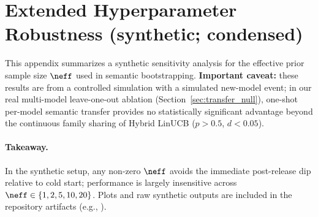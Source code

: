 \section{Extended Hyperparameter Robustness (synthetic; condensed)}
\label{appendix:hyperparameter_sensitivity}

This appendix summarizes a synthetic sensitivity analysis for the effective prior sample size \(\neff\) used in semantic bootstrapping. \textbf{Important caveat:} these results are from a controlled simulation with a simulated new-model event; in our real multi-model leave-one-out ablation (Section~\ref{sec:transfer_null}), one-shot per-model semantic transfer provides no statistically significant advantage beyond the continuous family sharing of Hybrid LinUCB ($p{>}0.5$, $d{<}0.05$).

\paragraph{Takeaway.} In the synthetic setup, any non-zero \(\neff\) avoids the immediate post-release dip relative to cold start; performance is largely insensitive across \(\neff \in \{1,2,5,10,20\}\). Plots and raw synthetic outputs are included in the repository artifacts (e.g., ).

